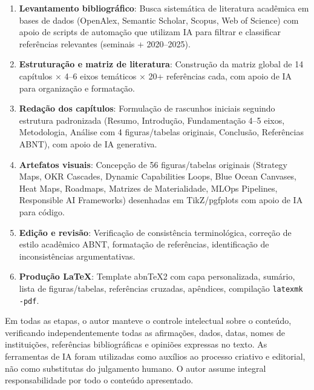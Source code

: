 \documentclass[12pt,a4paper]{abntex2}
\begin{document}
\begin{enumerate}
    \item \textbf{Levantamento bibliográfico}: Busca sistemática de literatura acadêmica em bases de dados (OpenAlex, Semantic Scholar, Scopus, Web of Science) com apoio de scripts de automação que utilizam IA para filtrar e classificar referências relevantes (seminais + 2020–2025).
    
    \item \textbf{Estruturação e matriz de literatura}: Construção da matriz global de 14 capítulos × 4–6 eixos temáticos × 20+ referências cada, com apoio de IA para organização e formatação.
    
    \item \textbf{Redação dos capítulos}: Formulação de rascunhos iniciais seguindo estrutura padronizada (Resumo, Introdução, Fundamentação 4–5 eixos, Metodologia, Análise com 4 figuras/tabelas originais, Conclusão, Referências ABNT), com apoio de IA generativa.
    
    \item \textbf{Artefatos visuais}: Concepção de 56 figuras/tabelas originais (Strategy Maps, OKR Cascades, Dynamic Capabilities Loops, Blue Ocean Canvases, Heat Maps, Roadmaps, Matrizes de Materialidade, MLOps Pipelines, Responsible AI Frameworks) desenhadas em TikZ/pgfplots com apoio de IA para código.
    
    \item \textbf{Edição e revisão}: Verificação de consistência terminológica, correção de estilo acadêmico ABNT, formatação de referências, identificação de inconsistências argumentativas.
    
    \item \textbf{Produção LaTeX}: Template abnTeX2 com capa personalizada, sumário, lista de figuras/tabelas, referências cruzadas, apêndices, compilação \texttt{latexmk -pdf}.
\end{enumerate}

Em todas as etapas, o autor manteve o controle intelectual sobre o conteúdo, verificando independentemente todas as afirmações, dados, datas, nomes de instituições, referências bibliográficas e opiniões expressas no texto. As ferramentas de IA foram utilizadas como auxílios ao processo criativo e editorial, não como substitutas do julgamento humano. O autor assume integral responsabilidade por todo o conteúdo apresentado.

\renewcommand{\listfigurename}{Lista de Figuras}
\renewcommand{\listtablename}{Lista de Tabelas}
\end{document}
